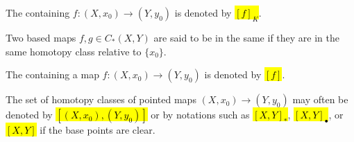 \begin{definition}
\begin{enumerate}
        The  containing $f: (X,x_0) \to (Y,y_0)$ is denoted by \hl{$[f]_K$}.

        Two based maps $f, g \in C_*(X,Y)$ are said to be in the same  if they are in the same homotopy class relative to $\{x_0\}$.

        The  containing a map $f:(X,x_0) \to (Y,y_0)$ is denoted by \hl{$[f]$}.

        The set of homotopy classes of pointed maps $(X,x_0) \to (Y,y_0)$ may often be denoted by \hl{$[(X,x_0),(Y,y_0)]$} or by notations such as  \hl{$[X,Y]_*$}, \hl{$[X,Y]_\bullet$}, or \hl{$[X,Y]$} if the base points are clear.
    \end{enumerate}
\end{definition}